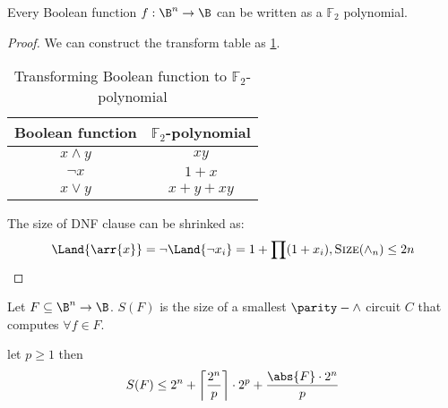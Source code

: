 \begin{theorem}
Every Boolean function \(f: \B^n \rightarrow \B\) can be written as a \(\mathbb{F}_2\) polynomial.
\end{theorem}

\begin{proof}
We can construct the transform table as \ref{tab:f2_transform}.

\begin{table}[ht]
    \centering
    \begin{tabular}{c|c}
    \hline
         Boolean function & \(\mathbb{F}_2\)-polynomial \\\hline
         \(x \land y\) & $xy$ \\\hline
  \(\lnot x\) & $1+x$ \\\hline
  \(x \lor y\) & $x+y+xy$ \\\hline
    \end{tabular}
    \caption{Transforming Boolean function to $\mathbb{F}_2$-polynomial}
    \label{tab:f2_transform}
\end{table}

The size of DNF clause can be shrinked as:
$$\Land \{\arr{x}\} = \lnot\Land\{\lnot x_i\} = 1 + \prod (1+x_i), \text{\textsc{Size}}(\land_n) \le 2n$$
\end{proof}

\begin{definition}
Let \(F \subseteq \B^n \rightarrow \B\). \(S(F)\) is the
  size of a smallest \(\parity-\land\) circuit $C$ that computes
  \(\forall f \in F\).
\end{definition}

\begin{lemma}\label{lm:polynomial-function-group}
let \(p \ge 1\) then
$$S(F) \le 2^n + \left\lceil \frac{2^n}{p} \right\rceil \cdot 2^p + \frac{\abs{F}\cdot 2^n}{p}$$
\end{lemma}

